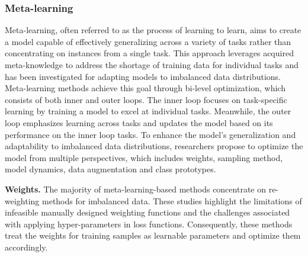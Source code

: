 
\subsubsection{Meta-learning}

Meta-learning, often referred to as the process of learning to learn, aims to create a model capable of effectively generalizing across a variety of tasks rather than concentrating on instances from a single task. This approach leverages acquired meta-knowledge to address the shortage of training data for individual tasks and has been investigated for adapting models to imbalanced data distributions. Meta-learning methods achieve this goal through bi-level optimization, which consists of both inner and outer loops. The inner loop focuses on task-specific learning by training a model to excel at individual tasks. Meanwhile, the outer loop emphasizes learning across tasks and updates the model based on its performance on the inner loop tasks. To enhance the model's generalization and adaptability to imbalanced data distributions, researchers propose to optimize the model from multiple perspectives, which includes {weights, sampling method, model dynamics, data augmentation and class prototypes}.

\textbf{Weights.}
The majority of meta-learning-based methods \cite{ren2018learning, shu2019meta, lee2020l2b, jamal2020rethinking, zhang2021learning} concentrate on re-weighting methods for imbalanced data. These studies highlight the limitations of infeasible manually designed weighting functions and the challenges associated with applying hyper-parameters in loss functions. Consequently, these methods treat the weights for training samples as learnable parameters and optimize them accordingly.

